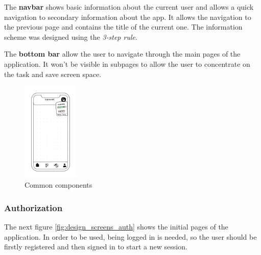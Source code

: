 The \textbf{navbar} shows basic information about the current user and allows a quick navigation to secondary information about the app.
It allows the navigation to the previous page and contains the title of the current one. The information scheme was designed
using the \textit{3-step rule}.

The \textbf{bottom bar} allow the user to navigate through the main pages of the application. 
It won't be visible in subpages to allow the user to concentrate on the task and save screen space.
\begin{figure}[H]
    \centering
    \includegraphics[width=0.24\textwidth]{assets/screens/Button - User.png}
    \caption{Common components}
    \label{fig:design_common}
\end{figure}

\subsubsection{Authorization}
The next figure \ref{fig:design_screens_auth} shows the initial pages of the application. In order to be used, being logged in is needed, so the user should be firstly registered and then signed in to start a new session.\\

